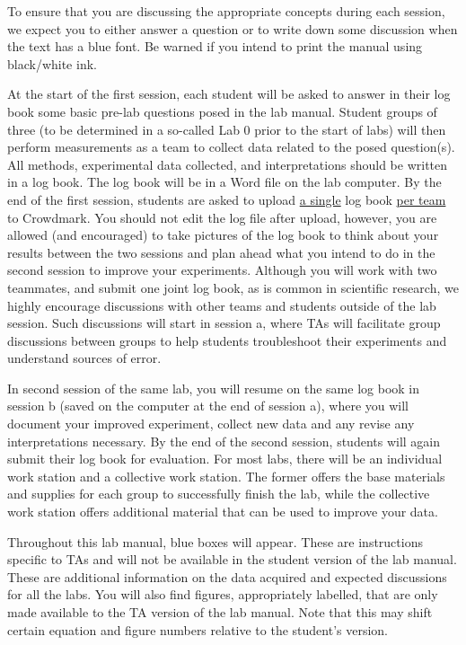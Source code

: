 \documentclass[12pt]{report}
\begin{document}
To ensure that you are discussing the appropriate concepts during each session, {\color{blue}we expect you to either answer a question or to write down some discussion when the text has a blue font.} 
Be warned if you intend to print the manual using black/white ink.

At the start of the first session, each student will be asked to answer in their log book some basic pre-lab questions posed in the lab manual. Student groups of three (to be determined in a so-called Lab 0 prior to the start of labs) will then perform measurements as a team to collect data related to the posed question(s). 
All methods, experimental data collected, and interpretations should be written in a log book. 
The log book will be in a Word file on the lab computer. By the end of the first session, students are asked to upload \underline{a single} log book \underline{per team} to Crowdmark. You should not edit the log file after upload, however, you are allowed (and encouraged) to take pictures of the log book to think about your results between the two sessions and plan ahead what you intend to do in the second session to improve your experiments. 
Although you will work with two teammates, and submit one joint log book, as is common in scientific research, we highly encourage discussions with other teams and students outside of the lab session. Such discussions will start in session a, where TAs will facilitate group discussions between groups to help students troubleshoot their experiments and understand sources of error. 

In second session of the same lab, you will resume on the same log book in session b (saved on the computer at the end of session a), where you will document your improved experiment, collect new data and any revise any interpretations necessary. 
By the end of the second session, students will again submit their log book for evaluation. For most labs, there will be an individual work station and a collective work station. The former offers the base materials and supplies for each group to successfully finish the lab, while the collective work station offers additional material that can be used to improve your data.

\begin{tcolorbox}[title=Comments for TAs]
Throughout this lab manual, blue boxes will appear. These are instructions specific to TAs and will not be available in the student version of the lab manual.
These are additional information on the data acquired and expected discussions for all the labs.
You will also find figures, appropriately labelled, that are only made available to the TA version of the lab manual.
Note that this may shift certain equation and figure numbers relative to the student's version.
\end{tcolorbox}
\end{document}

